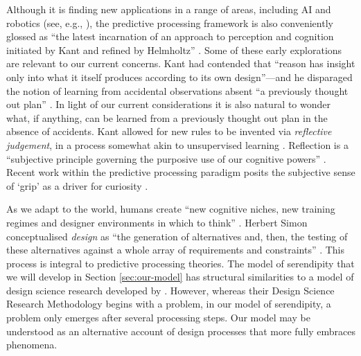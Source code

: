 Although it is finding new applications in a range of areas, including AI and robotics (see, e.g., \citet{DBLP:journals/corr/McGregorBB15,10.3389/frobt.2018.00021,thornton2017predictive}), the predictive processing framework is also conveniently glossed as ``the latest incarnation of an approach to perception and cognition initiated by Kant and refined by Helmholtz'' \cite{swanson2016predictive}.  Some of these early explorations are relevant to our current concerns.  Kant had contended that ``reason has insight only into what it itself produces according to its own design''---and he disparaged the notion of learning from accidental observations absent ``a previously thought out plan'' \cite[p.~20]{kant1929critique}.  In light of our current considerations it is also natural to wonder what, if anything, can be learned from a previously thought out plan in the absence of accidents.  Kant allowed for new rules to be invented via \emph{reflective judgement}, in a process somewhat akin to unsupervised learning \cite[p.~265]{kant1987critique}.  Reflection is a ``subjective principle governing the purposive use of our cognitive powers'' \cite[p.~266]{kant1987critique}.  Recent work within the predictive processing paradigm posits the subjective sense of `grip' as a driver for curiosity \cite{Kiverstein2017}.

As we adapt to the world, humans create ``new cognitive niches, new training regimes and designer environments in which to think'' \cite[p.~265]{pittphilsci10470}.  
Herbert Simon  conceptualised \emph{design} as ``the generation of alternatives and, then, the testing of these alternatives against a whole array of requirements and constraints'' \cite[pp.~128--129]{simon1996sciences}. This process is integral to predictive processing theories. 
The model of serendipity that we will develop in Section \ref{sec:our-model} has structural similarities to a model of design science research developed by \citet{Peffers:2007:DSR:1481765.1481768}.  However, whereas their Design Science Research Methodology begins with a problem, in our model of serendipity, a problem only emerges after several processing steps.  Our model may be understood as an alternative account of design processes that more fully embraces phenomena.

